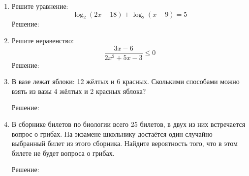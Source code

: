 \documentclass{article}
\begin{document}
\begin{enumerate}
\item %
Решите уравнение:
$$\log_2{(2x-18)}+\log_2{(x-9)}=5$$
Решение:


\item %
Решите неравенство:
$$\frac{3x-6}{2x^2+5x-3}\leq0$$
Решение:


\item %
В вазе лежат яблоки: 12 жёлтых и 6 красных. Сколькими способами можно взять из вазы 4 жёлтых и 2 красных яблока?

Решение:



\item %
В сборнике билетов по биологии всего 25 билетов, в двух из них встречается вопрос о грибах. На экзамене школьнику достаётся один случайно выбранный билет из этого сборника. Найдите вероятность того, что в этом билете не будет вопроса о грибах.

Решение:

\end{enumerate}
\end{document}

